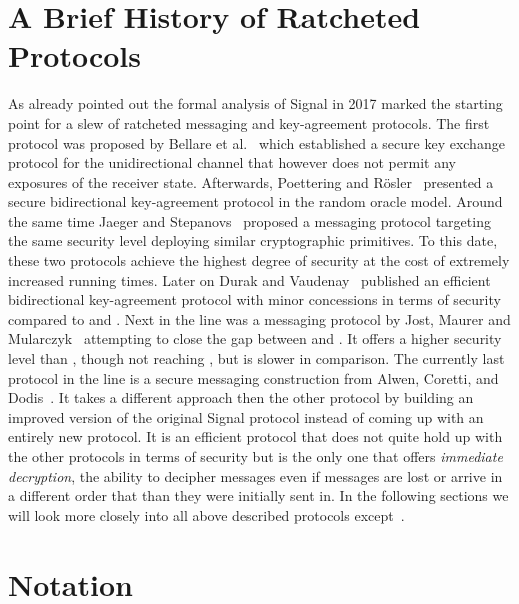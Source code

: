 \documentclass[11pt,a4paper,twoside,openright,bibliography=totoc]{scrbook}
\begin{document}
\section{A Brief History of Ratcheted Protocols}
\label{sec:brief-hist-ratch}

As already pointed out the formal analysis of Signal in 2017 marked the
starting point for a slew of ratcheted messaging and key-agreement
protocols. The first protocol was proposed by Bellare et
al.~\cite{bellare2017ratcheted} which established a secure key
exchange protocol for the unidirectional channel that however does not
permit any exposures of the receiver state. Afterwards, Poettering and
Rösler~\cite{poettering2018towards} presented a secure bidirectional
key-agreement protocol in the random oracle model. Around the same
time Jaeger and Stepanovs~\cite{jaeger2018optimal} proposed a
messaging protocol targeting the same security level deploying
similar cryptographic primitives. To this date, these two protocols achieve the
highest degree of security at the cost of extremely increased running
times. Later on Durak and Vaudenay~\cite{durak2018bidirectional}
published an efficient bidirectional key-agreement protocol with minor
concessions in terms of security compared to
\cite{poettering2018towards} and \cite{jaeger2018optimal}. Next in
the line was a messaging protocol by Jost, Maurer and
Mularczyk~\cite{jostefficient} attempting to close the gap between
\cite{durak2018bidirectional} and
\cite{poettering2018towards,jaeger2018optimal}. It offers a higher
security level than \cite{durak2018bidirectional}, though not reaching
\cite{poettering2018towards,jaeger2018optimal}, but is slower in
comparison. The currently last protocol in the line is a secure messaging construction
from Alwen, Coretti, and Dodis~\cite{alwen2018double}. It takes
a different approach then the other protocol by building an
improved version of the original Signal protocol instead of
coming up with an entirely new protocol. It is an efficient protocol
that does not quite hold up with the other protocols in terms of
security but is the only one that offers \textit{immediate decryption},
the ability to decipher messages even if messages are lost or arrive in
a different order that than they were initially sent in.
In the following sections we will look more closely into all
above described protocols except~\cite{bellare2017ratcheted}.

\section{Notation}
\label{sec:notation}
\end{document}
